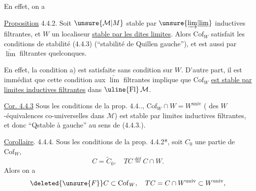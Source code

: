 
En effet, on a

\uline{Proposition} 4.4.2. Soit $\unsure{\mathcal M|M}$ stable par  $\unsure{\underrightarrow{\lim}|\underline{\lim}}$ inductives
filtrantes, et $W$  un localiseur 
\uline{stable par les dites limites}. Alors $\mathrm{Cof}_W$ satisfait les
conditions de stabilité (4.4.3) (``stabilité
de Quillen gauche''), et est  aussi
par $\underrightarrow{\lim}$ filtrantes quelconques.

En effet, la condition a) est satisfaite
sans condition  sur $W$. D'autre part,
il est immédiat que cette condition
 aux $\underrightarrow{\lim}$ filtrantes implique que
$\mathrm{Cof}_W$ \uline{est stable par limites inductives
filtrantes} dans $\uline{\mathrm{Fl}}\,\mathcal M$.

\uline{Cor. 4.4.3} Sous les conditions de la prop.
4.4.., $\mathrm{Cof}_W\cap W=W^{\mathrm{univ}}$ ( des
$W$-équivalences co-universelles dans $\mathcal M$) est
stable par limites inductives filtrantes,
et  donc ``Qstable à gauche''
au sens de (4.4.3.).

\uline{Corollaire}. 4.4.4. Sous les conditions de
la prop. 4.4.2\deleted{\unsure{,}}*,   soit $C_0$ une  partie de $\mathrm{Cof}_W$,
\[
 C=\widetilde C_0,\quad TC\overset{\mathrm{déf}}{=}C\cap W.
\]
Alors on a
\[
 \deleted{\unsure{F}}C\subset\mathrm{Cof}_W,\quad TC=C\cap W^{\mathrm{univ}}\subset W^{\mathrm{univ}},
\]

